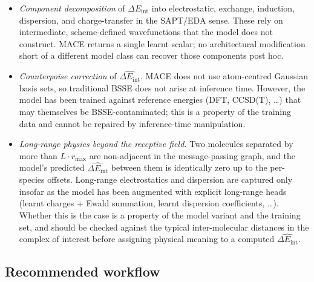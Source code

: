 \documentclass[11pt,a4paper]{article}
\newcommand{\Eint}{\Delta E_{\mathrm{int}}}
\newcommand{\rmax}{r_{\mathrm{max}}}
\begin{document}
\begin{itemize}[leftmargin=1.4em]
\item \emph{Component decomposition} of $\Eint$ into electrostatic, exchange,
induction, dispersion, and charge-transfer in the SAPT/EDA sense. These rely
on intermediate, scheme-defined wavefunctions that the model does not
construct. \textsc{MACE} returns a single learnt scalar; no architectural
modification short of a different model class can recover those components
post hoc.

\item \emph{Counterpoise correction} of $\widehat{\Eint}$. \textsc{MACE} does
not use atom-centred Gaussian basis sets, so traditional BSSE does not arise
at inference time. However, the model has been trained against reference
energies (DFT, CCSD(T), \ldots) that may themselves be BSSE-contaminated;
this is a property of the training data and cannot be repaired by inference-time
manipulation.

\item \emph{Long-range physics beyond the receptive field.} Two molecules
separated by more than $L \cdot \rmax$ are non-adjacent in the message-passing
graph, and the model's predicted $\widehat{\Eint}$ between them is identically
zero up to the per-species offsets. Long-range electrostatics and dispersion
are captured only insofar as the model has been augmented with explicit
long-range heads (learnt charges + Ewald summation, learnt dispersion
coefficients, \ldots). Whether this is the case is a property of the model
variant and the training set, and should be checked against the typical
inter-molecular distances in the complex of interest before assigning physical
meaning to a computed $\widehat{\Eint}$.
\end{itemize}

\subsection{Recommended workflow}
\end{document}
